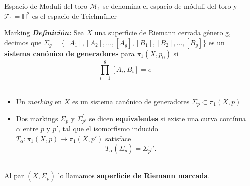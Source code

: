 \documentclass[final]{beamer}
\newcommand\Hs{\ensuremath{\mathbb{H}}}
\newlength{\sepwidth}
\newlength{\colwidth}
\newcommand{\separatorcolumn}{\begin{column}{\sepwidth}\end{column}}
\newcommand{\defi}[1]{\textbf{\emph{#1}}}
\begin{document}
\begin{frame}[t,fragile]
\begin{columns}[t]
\begin{column}{\colwidth}
\begin{block}{Espacio de Moduli del toro}
    $\mathcal{M}_1$ se denomina el espacio de móduli del toro y $\mathcal{T}_1 = \Hs^2 $ es el espacio de Teichmüller
\end{block}
\begin{alertblock}{Marking}
    \defi{Definición: }Sea $X$ una superficie de Riemann cerrada género g,  decimos que $\Sigma_g = \{[A_1],[A_2],\ldots,[A_g],[B_1],[B_2],\ldots, [B_g]\}$ es un \textbf{sistema canónico de generadores} para $\pi_1(X,p_0)$ si\\
    $$\prod_{i=1}^g [A_i,B_i] = e$$\\
    \begin{itemize}
        \item Un \textit{marking} en $X$ es un sistema canónico de generadores $\Sigma_p \subset \pi_1(X,p)$
        \item Dos markings $\Sigma_p$ y $\Sigma_{p'}^\prime$ se dicen  \textbf{equivalentes} si existe una curva contínua $\alpha$ entre $p$ y $p'$, tal que el isomorfismo inducido $T_\alpha: \pi_1(X,p) \rightarrow \pi_1(X,p')$ satisface\\
        $$
        T_\alpha(\Sigma_p) = \Sigma_{p^\prime}'.
        $$\\
    \end{itemize}
    Al par $(X,\Sigma_p)$ lo llamamos \textbf{superficie de Riemann marcada}. 
\end{alertblock}
\end{column}

\separatorcolumn

\end{columns}
\end{frame}

\newpage
\thispagestyle{empty}
\vspace*{-1.5cm}
\end{document}
